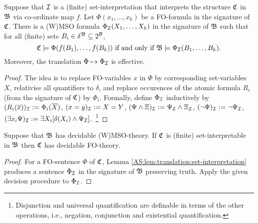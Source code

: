 \begin{lemma} \label{AS:lem:translation:set-interpretation} 
Suppose that ${\mathcal I}$ is a (finite) set-interpretation that interprets the structure $\mathfrak{C}$ in $\mathfrak{B}$ via co-ordinate map $f$.
Let $\Phi(x_1,\dots,x_k)$ be a FO-formula in the signature of $\mathfrak{C}$. 
There is a (W)MSO formula $\Phi_{\mathcal I}(X_1,\dots,X_k)$ in the signature of $\mathfrak{B}$ such that for all (finite) sets $B_i \in \delta^{\mathfrak{B}} \subseteq 2^{\mathcal B}$,
\[
\mathfrak{C} \models \Phi(f(B_1),\dots,f(B_k)) \mbox{ if and only if } \mathfrak{B} \models \Phi_{\mathcal I}(B_1,\dots,B_k).
\]
Moreover, the translation $\Phi \mapsto \Phi_{\mathcal I}$ is effective.
\end{lemma}

\begin{proof}
The idea is to replace FO-variables $x$ in $\Phi$ by corresponding set-variables $X$, relativise all quantifiers to $\delta$, and replace 
occurences of the atomic formula $R_i$ (from the signature of $\mathfrak{C}$) by $\Phi_i$. Formally, define $\Phi_{\mathcal I}$ inductively by 
$(R_i(\mbox{$\overline {x}$}))_{\mathcal I}  := \Phi_i(\mbox{$\overline {X}$})$, $(x = y)_{\mathcal I} := X = Y$,
$(\Psi \wedge \Xi)_{\mathcal I}  := \Psi_{\mathcal I} \wedge \Xi_{\mathcal I}$,
$(\neg \Psi)_{\mathcal I}  := \neg \Psi_{\mathcal I}$,
$(\exists x_i \Psi)_{\mathcal I}  := \exists X_i [\delta(X_i) \wedge \Psi_{\mathcal I}]$.~\footnote{Disjunction and universal quantification are definable in terms of the other operations, i.e., negation, conjunction and existential quantification.}
\end{proof}





\begin{proposition}
Suppose that $\mathfrak{B}$ has decidable (W)MSO-theory. If $\mathfrak{C}$ is (finite) set-interpretable 
in $\mathfrak{B}$ then $\mathfrak{C}$ has decidable FO-theory. 
\end{proposition}
\begin{proof}
For a FO-sentence $\Phi$ of $\mathfrak{C}$, Lemma \ref{AS:lem:translation:set-interpretation} produces a sentence $\Phi_{\mathcal I}$ in the signature of $\mathfrak{B}$ preserving truth. 
Apply the given decision procedure to $\Phi_{\mathcal I}$. 
\end{proof}

